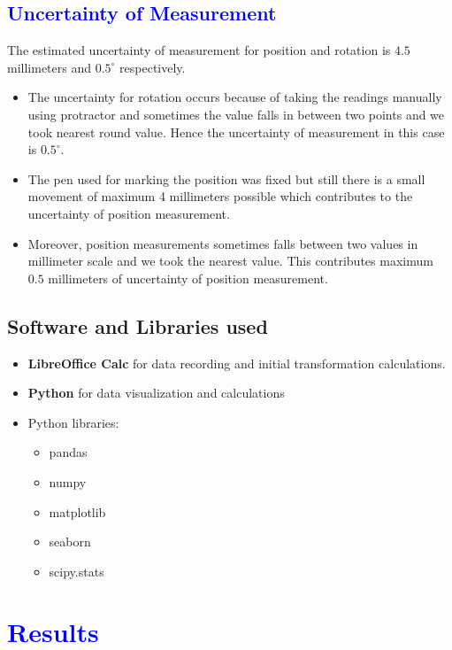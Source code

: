 \documentclass[10pt,a4paper]{article}
\begin{document}
				\subsection{\textcolor{blue}{Uncertainty of Measurement}}
				The estimated uncertainty of measurement for position and rotation is $4.5$ millimeters and $0.5^{\circ}$ respectively.  
				\begin{itemize}
					\item The uncertainty for rotation occurs because of taking the readings manually using protractor and sometimes the value falls in between two points and we took nearest round value. Hence the uncertainty of measurement in this case is $0.5^{\circ}$.
					
					\item  The pen used for marking the position was fixed but still there is a small movement of maximum 4 millimeters possible which contributes to the uncertainty of position measurement.
					
					\item Moreover, position measurements sometimes falls between two values in millimeter scale and we took the nearest value. This contributes maximum $0.5$ millimeters of uncertainty of position measurement.
				\end{itemize}
				\subsection{Software and Libraries used}
				\begin{itemize}
					\item \textbf{LibreOffice Calc} for data recording and initial transformation calculations.
					\item \textbf{Python} for data visualization and calculations
					\item Python libraries:
					\begin{itemize}
						\item pandas
						\item numpy
						\item matplotlib
						\item seaborn
						\item scipy.stats
					\end{itemize}
				\end{itemize}		
				
			\section{\textcolor{blue}{Results}}
\end{document}
